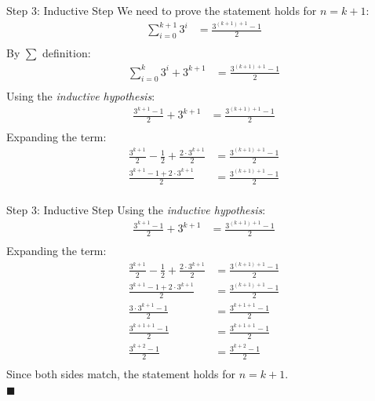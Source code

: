 \documentclass[aspectratio=169]{beamer}
\renewcommand{\qed}{\\ \hfill $\blacksquare$}
\begin{document}
\begin{frame}{Step 3: Inductive Step}
    \scriptsize
    We need to prove the statement holds for $n = k + 1$:
    \begin{align*}
        \sum_{i = 0}^{k + 1} 3^i &= \frac{3^{(k + 1) + 1} - 1}{2} \\
    \end{align*}
    \pause
    \vspace{-5mm}
    By $\sum$ definition:
    \begin{align*}
        \sum_{i = 0}^k 3^i + 3^{k + 1} &= \frac{3^{(k + 1) + 1} - 1}{2} \\
    \end{align*}
    \pause
    Using the \textit{inductive hypothesis}:
    \begin{align*}
        \frac{3^{k + 1} - 1}{2} + 3^{k + 1} &= \frac{3^{(k + 1) + 1} - 1}{2} \\
    \end{align*}
    \pause
    Expanding the term:
    \begin{align*}
        \frac{3^{k + 1}}{2} - \frac{1}{2} + \frac{2 \cdot 3^{k + 1}}{2} &= \frac{3^{(k + 1) + 1} - 1}{2} \\
        \frac{3^{k + 1} - 1 + 2 \cdot 3^{k + 1}}{2} &= \frac{3^{(k + 1) + 1} -    1}{2} \\
    \end{align*}
\end{frame}

\begin{frame}{Step 3: Inductive Step}
    \scriptsize
    Using the \textit{inductive hypothesis}:
    \begin{align*}
        \frac{3^{k + 1} - 1}{2} + 3^{k + 1} &= \frac{3^{(k + 1) + 1} - 1}{2} \\
    \end{align*}
    Expanding the term:
    \begin{align*}
        \frac{3^{k + 1}}{2} - \frac{1}{2} + \frac{2 \cdot 3^{k + 1}}{2} &= \frac{3^{(k + 1) + 1} - 1}{2} \\
        \frac{3^{k + 1} - 1 + 2 \cdot 3^{k + 1}}{2} &= \frac{3^{(k + 1) + 1} - 1}{2} \\
        \frac{3 \cdot 3^{k + 1} - 1}{2} &= \frac{3^{k + 1 + 1} - 1}{2} \\
        \frac{3^{k + 1 + 1} - 1}{2} &= \frac{3^{k + 1 + 1} - 1}{2} \\
        \frac{3^{k + 2} - 1}{2} &= \frac{3^{k + 2} - 1}{2} \\
    \end{align*}
    \pause
    Since both sides match, the statement holds for $n = k + 1$.
    \qed
\end{frame}
\end{document}
